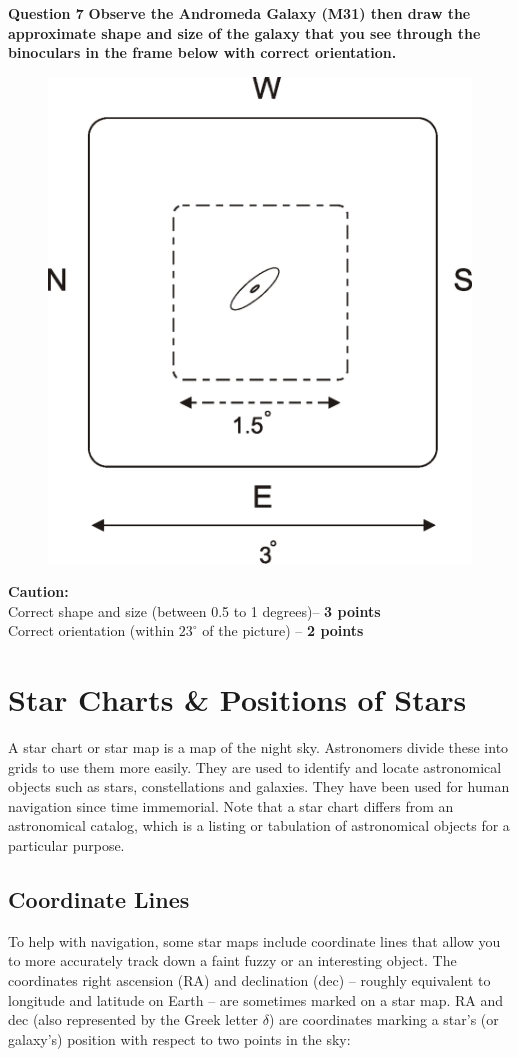 \documentclass[a4paper,12pt]{extarticle}
\begin{document}
\textsf{\textbf{Question 7}} \textbf{Observe the Andromeda Galaxy (M31) then draw the approximate shape and size of the galaxy that you see through the binoculars in the frame below with correct orientation.}
\begin{figure}[H]
	\centering
	\includegraphics[width=0.4\linewidth]{andromedasize.eps}
\end{figure}

\begin{pro}
	\textbf{Caution:}\\
	{\color{red} Correct shape and size (between 0.5 to 1 degrees)-- \textbf{3 points}\\
		Correct orientation (within $23^\circ$ of the picture) -- \textbf{ 2 points}}
\end{pro}



\clearpage



\section{Star Charts \& Positions of Stars}

A star chart or star map is a map of the night sky. Astronomers divide these into grids to use them more easily. They are used to identify and locate astronomical objects such as stars, constellations and galaxies. They have been used for human navigation since time immemorial. Note that a star chart differs from an astronomical catalog, which is a listing or tabulation of astronomical objects for a particular purpose. 

\subsection{Coordinate Lines}

To help with navigation, some star maps include coordinate lines that allow you to more accurately track down a faint fuzzy or an interesting object. The coordinates right ascension (RA) and declination (dec) – roughly equivalent to longitude and latitude on Earth – are sometimes marked on a star map. RA and dec (also represented by the Greek letter $\delta$) are coordinates marking a star’s (or galaxy’s) position with respect to two points in the sky:
\end{document}
